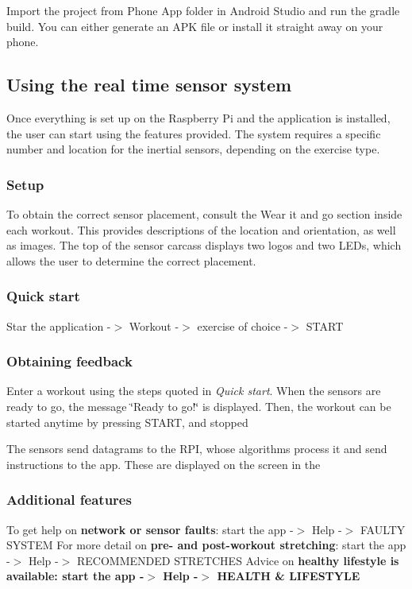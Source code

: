 Import the project from Phone App folder in Android Studio and run the gradle build. You can either generate an A\+PK file or install it straight away on your phone.

\subsection*{Using the real time sensor system}

Once everything is set up on the Raspberry Pi and the application is installed, the user can start using the features provided. The system requires a specific number and location for the inertial sensors, depending on the exercise type.

\subsubsection*{Setup}

To obtain the correct sensor placement, consult the Wear it and go section inside each workout. This provides descriptions of the location and orientation, as well as images. The top of the sensor carcass displays two logos and two L\+E\+Ds, which allows the user to determine the correct placement. \subsubsection*{Quick start}

Star the application -\/$>$ Workout -\/$>$ exercise of choice -\/$>$ S\+T\+A\+RT

\subsubsection*{Obtaining feedback}

Enter a workout using the steps quoted in {\itshape Quick start}. When the sensors are ready to go, the message \char`\"{}\+Ready to go!\char`\"{} is displayed. Then, the workout can be started anytime by pressing S\+T\+A\+RT, and stopped

The sensors send datagrams to the R\+PI, whose algorithms process it and send instructions to the app. These are displayed on the screen in the

\subsubsection*{Additional features}

To get help on {\bfseries{network or sensor faults}}\+: start the app -\/$>$ Help -\/$>$ F\+A\+U\+L\+TY S\+Y\+S\+T\+EM For more detail on {\bfseries{pre-\/ and post-\/workout stretching}}\+: start the app -\/$>$ Help -\/$>$ R\+E\+C\+O\+M\+M\+E\+N\+D\+ED S\+T\+R\+E\+T\+C\+H\+ES Advice on {\bfseries{healthy lifestyle{\bfseries{ is available\+: start the app -\/$>$ Help -\/$>$ H\+E\+A\+L\+TH \& L\+I\+F\+E\+S\+T\+Y\+LE}}}}

